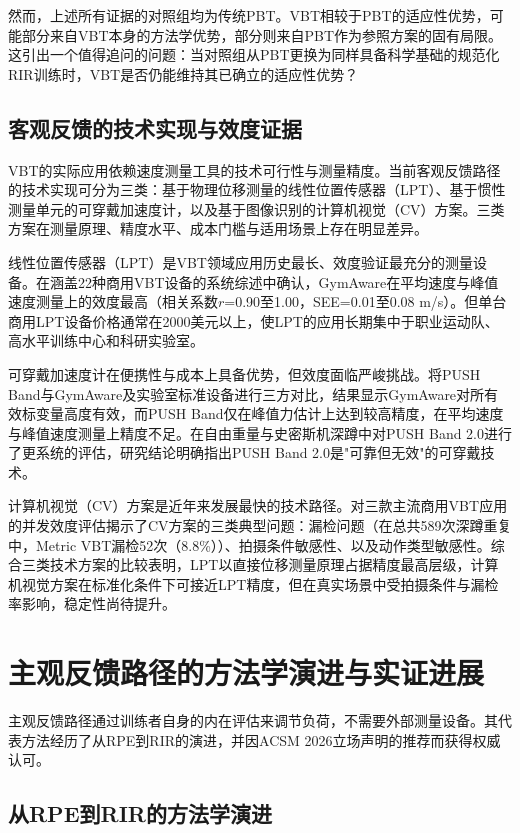 然而，上述所有证据的对照组均为传统PBT。VBT相较于PBT的适应性优势，可能部分来自VBT本身的方法学优势，部分则来自PBT作为参照方案的固有局限。这引出一个值得追问的问题：当对照组从PBT更换为同样具备科学基础的规范化RIR训练时，VBT是否仍能维持其已确立的适应性优势？

\subsection{客观反馈的技术实现与效度证据}

VBT的实际应用依赖速度测量工具的技术可行性与测量精度。当前客观反馈路径的技术实现可分为三类：基于物理位移测量的线性位置传感器（LPT）、基于惯性测量单元的可穿戴加速度计，以及基于图像识别的计算机视觉（CV）方案。三类方案在测量原理、精度水平、成本门槛与适用场景上存在明显差异。

线性位置传感器（LPT）是VBT领域应用历史最长、效度验证最充分的测量设备。\citep{Weakley2021}在涵盖22种商用VBT设备的系统综述中确认，GymAware在平均速度与峰值速度测量上的效度最高（相关系数$r$=0.90至1.00，SEE=0.01至0.08 m/s）。但单台商用LPT设备价格通常在2000美元以上，使LPT的应用长期集中于职业运动队、高水平训练中心和科研实验室。

可穿戴加速度计在便携性与成本上具备优势，但效度面临严峻挑战。\citep{Banyard2017}将PUSH Band与GymAware及实验室标准设备进行三方对比，结果显示GymAware对所有效标变量高度有效，而PUSH Band仅在峰值力估计上达到较高精度，在平均速度与峰值速度测量上精度不足。\citep{PerezCastilla2022}在自由重量与史密斯机深蹲中对PUSH Band 2.0进行了更系统的评估，研究结论明确指出PUSH Band 2.0是"可靠但无效"的可穿戴技术。

计算机视觉（CV）方案是近年来发展最快的技术路径。\citep{Renner2024}对三款主流商用VBT应用的并发效度评估揭示了CV方案的三类典型问题：漏检问题（在总共589次深蹲重复中，Metric VBT漏检52次（8.8\%））、拍摄条件敏感性、以及动作类型敏感性。综合三类技术方案的比较表明，LPT以直接位移测量原理占据精度最高层级，计算机视觉方案在标准化条件下可接近LPT精度，但在真实场景中受拍摄条件与漏检率影响，稳定性尚待提升。

\section{主观反馈路径的方法学演进与实证进展}

主观反馈路径通过训练者自身的内在评估来调节负荷，不需要外部测量设备。其代表方法经历了从RPE到RIR的演进，并因ACSM 2026立场声明的推荐而获得权威认可。

\subsection{从RPE到RIR的方法学演进}


